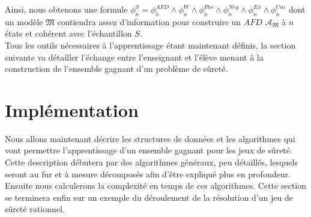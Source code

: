\documentclass[12pt,a4paper,oneside,titlepage]{report}
\begin{document}
Ainsi, nous obtenons une formule $\phi^S_n=\phi_n^{AFD}\land\phi_n^{W}\land\phi_n^{Pos}\land\phi_n^{Neg}\land\phi_n^{Ex}\land\phi_n^{Uni}$ dont un modèle $\mathfrak{M}$ contiendra assez d'information pour construire un $AFD$ $\mathcal{A}_\mathfrak{M}$ à $n$ états et cohérent avec l'échantillon $S$.\\

Tous les outils nécessaires à l'apprentissage étant maintenant définis, la section suivante va détailler l'échange entre l'enseignant et l'élève menant à la construction de l'ensemble gagnant d'un problème de sûreté.  
\newpage
\section{Implémentation}
Nous allons maintenant décrire les structures de données et les algorithmes qui vont permettre l'apprentissage d'un ensemble gagnant pour les jeux de sûreté. Cette description débutera par des algorithmes généraux, peu détaillés, lesquels seront au fur et à mesure décomposés afin d'être expliqué plus en profondeur.\\
Ensuite nous calculerons la complexité en temps de ces algorithmes. Cette section se terminera enfin sur un exemple du déroulement de la résolution d'un jeu de sûreté rationnel.
\end{document}
